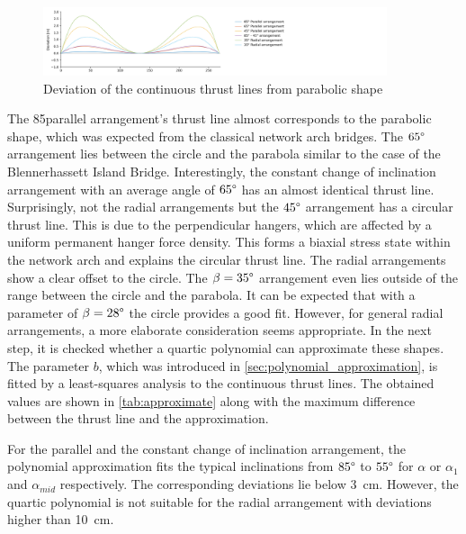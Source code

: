 \begin{figure}[H]
    \centering
    \includegraphics[trim={0 0 55cm 0},clip, width=0.9\textwidth]{overleaf/Pictures/myplot_3.png}
    \caption{Deviation of the continuous thrust lines from parabolic shape}
    \label{fig:continuous_thrust_lines}
\end{figure}

The 85\degree parallel arrangement's thrust line almost corresponds to the parabolic shape, which was expected from the classical network arch bridges. The $65\degree$ arrangement lies between the circle and the parabola similar to the case of the Blennerhassett Island Bridge. Interestingly, the constant change of inclination arrangement with an average angle of $65\degree$ has an almost identical thrust line. Surprisingly, not the radial arrangements but the $45\degree$ arrangement has a circular thrust line. This is due to the perpendicular hangers, which are affected by a uniform permanent hanger force density. This forms a biaxial stress state within the network arch and explains the circular thrust line. The radial arrangements show a clear offset to the circle. The $\beta=35\degree$ arrangement even lies outside of the range between the circle and the parabola. It can be expected that with a parameter of $\beta=28\degree$ the circle provides a good fit. However, for general radial arrangements, a more elaborate consideration seems appropriate. In the next step, it is checked whether a quartic polynomial can approximate these shapes. The parameter $b$, which was introduced in \cref{sec:polynomial_approximation}, is fitted by a least-squares analysis to the continuous thrust lines. The obtained values are shown in \cref{tab:approximate} along with the maximum difference between the thrust line and the approximation.



For the parallel and the constant change of inclination arrangement, the polynomial approximation fits the typical inclinations from $85\degree$ to $55\degree$ for $\alpha$ or $\alpha_1$ and $\alpha_{mid}$ respectively. The corresponding deviations lie below \SI{3}{cm}. However, the quartic polynomial is not suitable for the radial arrangement with deviations higher than \SI{10}{cm}.

